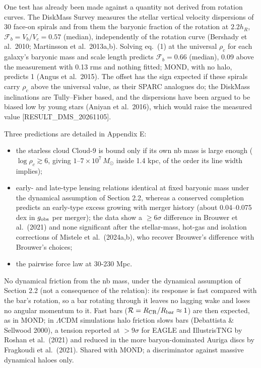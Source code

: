 \documentclass[
  10pt,
]{article}
\begin{document}
One test has already been made against a quantity not derived from rotation curves. The DiskMass Survey measures the stellar vertical velocity dispersions of 30 face-on spirals and from them the baryonic fraction of the rotation at $2.2h_R$, $\mathcal{F}_b=V_b/V_c=0.57$ (median), independently of the rotation curve (Bershady et al.~2010; Martinsson et al.~2013a,b). Solving eq.~(1) at the universal $\rho_c$ for each galaxy's baryonic mass and scale length predicts $\mathcal{F}_b=0.66$ (median), 0.09 above the measurement with 0.13 rms and nothing fitted; MOND, with no halo, predicts 1 (Angus et al.~2015). The offset has the sign expected if these spirals carry $\rho_c$ above the universal value, as their SPARC analogues do; the DiskMass inclinations are Tully--Fisher based, and the dispersions have been argued to be biased low by young stars (Aniyan et al.~2016), which would raise the measured value {[}RESULT\_DMS\_20261105{]}.

Three predictions are detailed in Appendix E:
\begin{itemize}
\item the starless cloud Cloud-9 is bound only if its own nb mass is large enough ($\log\rho_c\gtrsim6$, giving $1$--$7\times10^7\,M_\odot$ inside 1.4 kpc, of the order its line width implies);
\item early- and late-type lensing relations identical at fixed baryonic mass under the dynamical assumption of Section 2.2, whereas a conserved completion predicts an early-type excess growing with merger history (about 0.04--0.075 dex in $g_{\rm obs}$ per merger); the data show a $\ge6\sigma$ difference in Brouwer et al.~(2021) and none significant after the stellar-mass, hot-gas and isolation corrections of Mistele et al.~(2024a,b), who recover Brouwer's difference with Brouwer's choices;
\item the pairwise force law at 30-230 Mpc.
\end{itemize}
No dynamical friction from the nb mass, under the dynamical assumption of Section 2.2 (not a consequence of the relation): its response is fast compared with the bar's rotation, so a bar rotating through it leaves no lagging wake and loses no angular momentum to it. Fast bars ($\mathcal{R}=R_{\rm CR}/R_{\rm bar}\approx1$) are then expected, as in MOND; in $\Lambda$CDM simulations halo friction slows bars (Debattista \& Sellwood 2000), a tension reported at $>9\sigma$ for EAGLE and IllustrisTNG by Roshan et al.~(2021) and reduced in the more baryon-dominated Auriga discs by Fragkoudi et al.~(2021). Shared with MOND; a discriminator against massive dynamical haloes only.
\end{document}
